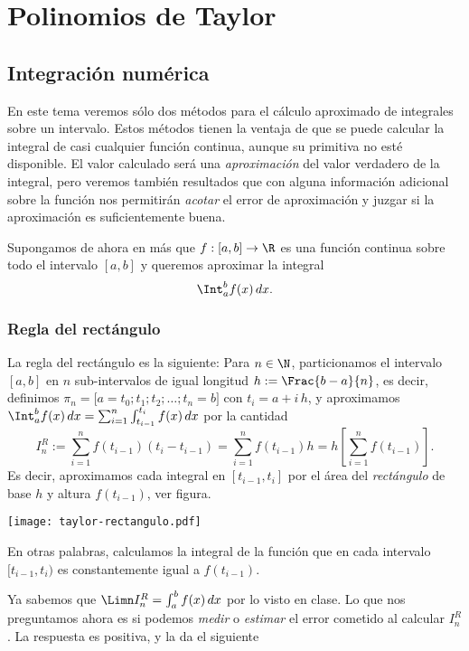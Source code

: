 
\chapter{Polinomios de Taylor}


\section{Integración numérica}

En este tema veremos sólo dos métodos para el cálculo aproximado de integrales sobre un intervalo. Estos métodos tienen la ventaja de que se puede calcular la integral de casi cualquier función continua, aunque su primitiva no esté disponible. El valor calculado será una \emph{aproximación} del valor verdadero de la integral, pero veremos también resultados que con alguna información adicional sobre la función nos permitirán \emph{acotar} el error de aproximación y juzgar si la aproximación es suficientemente buena.

Supongamos de ahora en más que $f:[a,b] \to \R$ es una función continua sobre todo el intervalo $[a,b]$ y queremos aproximar la integral 
\[
\Int_a^b f(x) \, dx. 
\]

\subsection{Regla del rectángulo}

La regla del rectángulo es la siguiente: Para $n\in\N$, particionamos el intervalo $[a,b]$ en $n$ sub-intervalos de igual longitud $h := \Frac{b-a}{n}$, es decir, definimos $\pi_n = \big[a = t_0; t_1; t_2; \dots ; t_n = b\big]$ con $t_i = a + i\, h$, y aproximamos $\Int_a^b f(x) \, dx = \sum_{i=1}^ n \int_{t_{i-1}}^{t_i} f(x)\,dx$ por la cantidad
\[
 I_n^R := \sum_{i=1}^n f(t_{i-1}) (t_{i} - t_{i-1}) = \sum_{i=1}^n f(t_{i-1}) h = h \left[\sum_{i=1}^n f(t_{i-1}) \right].
\]
Es decir, aproximamos cada integral en $[t_{i-1},t_i]$ por el área del \emph{rectángulo} de base $h$ y altura $f(t_{i-1})$, ver figura.

\centerline{\texttt{[image: taylor-rectangulo.pdf]}}

En otras palabras, calculamos la integral de la función que en cada intervalo $[t_{i-1},t_i)$ es constantemente igual a $f(t_{i-1})$.

Ya sabemos que $\Limn I_n^R = \int_a^b f(x)\, dx$ por lo visto en clase. Lo que nos preguntamos ahora es si podemos \emph{medir} o \emph{estimar} el error cometido al calcular $I_n^R$. La respuesta es positiva, y la da el siguiente 

